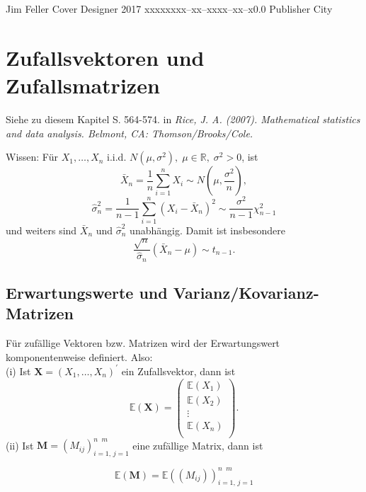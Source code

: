 \documentclass{tstextbook}
\begin{document}
       {Jim Feller}
       {Cover Designer}
       {2017}
       {xxxxx}{xxx--xx--xxxx--xx--x}{0.0}
       {Publisher}
       {City}



\chapter{Zufallsvektoren und Zufallsmatrizen}

\begin{book}
	Siehe zu diesem Kapitel S. 564-574. in \textit{Rice, J. A. (2007). Mathematical statistics and data analysis. Belmont, CA: Thomson/Brooks/Cole.} 
\end{book}




\begin{remark}
	Wissen: Für $ X_1, \ldots ,X_n $ i.i.d. $ N(\mu,\sigma^{2}), \; \mu\in\mathbb{R}, \; \sigma^2 > 0 $, ist 
	\[ \bar{X}_n = \frac{1}{n} \sum_{i=1}^{n} X_i \sim N\left(\mu, \frac{\sigma^2}{n} \right),
	\] 
	\[ \hat{\sigma}_n^2 = \frac{1}{n-1} \sum_{i=1}^{n} ( X_i - \bar{X}_n)^2 \sim \frac{\sigma^2}{n-1} \chi_{n-1}^2 
	\]  
	und weiters sind $ \bar{X}_n $  und $ \hat{\sigma}^2_n $ unabhängig. Damit ist insbesondere 
	\[ \frac{\sqrt{n}}{\hat{\sigma}_n}(\bar{X}_n-\mu) \sim t_{n-1}.
	\]
	
\end{remark}
 
 
 


\section{Erwartungswerte und Varianz/Kovarianz-Matrizen}


\begin{definition}[Erwartungswert]
	Für zufällige Vektoren bzw. Matrizen wird der Erwartungswert komponentenweise definiert. Also: \\
	(i) Ist $ \textbf{X}= \left(X_1, \ldots ,X_n\right)^\prime $  ein Zufallsvektor, dann ist 
\[ \mathbb{E}(\textbf{X}) = \begin{pmatrix} \mathbb{E}(X_1)\\
		\mathbb{E}(X_2)\\
		\vdots\\
		\mathbb{E}(X_n)\\
	\end{pmatrix}.
\]
	(ii) Ist $ \textbf{M}=(M_{ij})_{i=1,\, j=1}^{n \;\; m} $ eine zufällige Matrix, dann ist 
	
\[ 
\mathbb{E}(\textbf{M})= \mathbb{E} \left((M_{ij})\right)_{i=1,\, j=1}^{n \;\; m}	
\]
\end{definition}
\end{document}
